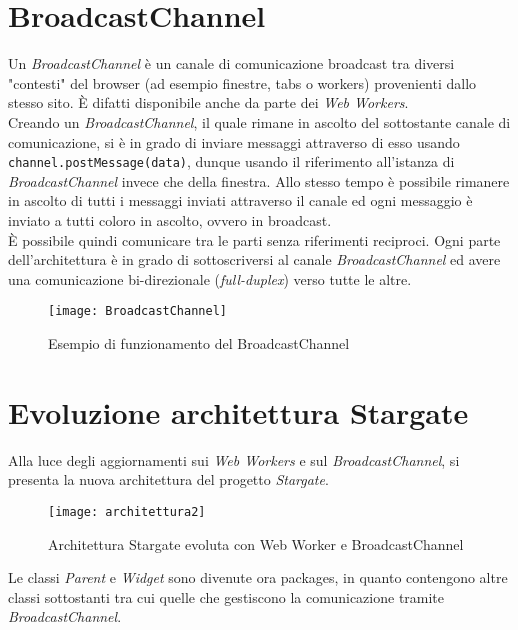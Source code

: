 \section{BroadcastChannel}

Un \textit{BroadcastChannel} è un canale di comunicazione broadcast tra diversi "contesti" del browser (ad esempio finestre, tabs o workers) provenienti dallo stesso sito. È difatti disponibile anche da parte dei \textit{Web Workers}. \\

Creando un \textit{BroadcastChannel}, il quale rimane in ascolto del sottostante canale di comunicazione, si è in grado di inviare messaggi attraverso di esso usando \texttt{channel.postMessage(data)}, dunque usando il riferimento all'istanza di \textit{BroadcastChannel} invece che della finestra. Allo stesso tempo è possibile rimanere in ascolto di tutti i messaggi inviati attraverso il canale ed ogni messaggio è inviato a tutti coloro in ascolto, ovvero in broadcast. \\

È possibile quindi comunicare tra le parti senza riferimenti reciproci. Ogni parte dell'architettura è in grado di sottoscriversi al canale \textit{BroadcastChannel} ed avere una comunicazione bi-direzionale (\textit{full-duplex}) verso tutte le altre.

\begin{figure}[H] 
  \centering 
  \texttt{[image: BroadcastChannel]} 
  \caption{Esempio di funzionamento del BroadcastChannel}
\end{figure}

\section{Evoluzione architettura Stargate}

Alla luce degli aggiornamenti sui \textit{Web Workers} e sul \textit{BroadcastChannel}, si presenta la nuova architettura del progetto \textit{Stargate}.

\begin{figure}[H] 
  \centering 
  \texttt{[image: architettura2]} 
  \caption{Architettura Stargate evoluta con Web Worker e BroadcastChannel}
\end{figure}

Le classi \textit{Parent} e \textit{Widget} sono divenute ora packages, in quanto contengono altre classi sottostanti tra cui quelle che gestiscono la comunicazione tramite \textit{BroadcastChannel}. \\

